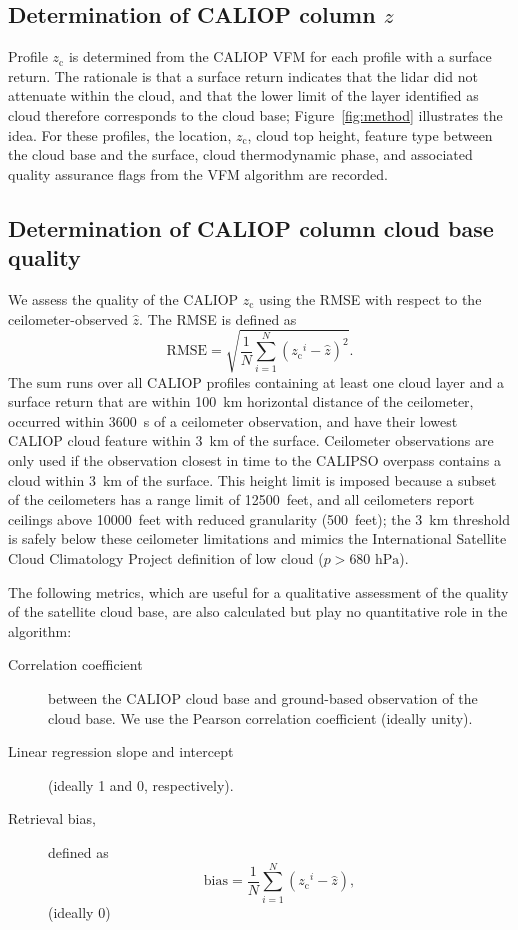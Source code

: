 \documentclass[essd,manuscript]{copernicus}
\begin{document}
\subsection{Determination of CALIOP column \ensuremath{z}{}}
\label{sec:algorithm:local}
Profile \ensuremath{z_\text{c}}{} is determined from the CALIOP VFM for each profile with a surface
return.  The rationale is that a surface return indicates that the lidar did not
attenuate within the cloud, and that the lower limit of the layer identified as
cloud therefore corresponds to the cloud base; Figure~\ref{fig:method}
illustrates the idea.  For these profiles, the location, \ensuremath{z_\text{c}}{}, cloud top height,
feature type between the cloud base and the surface,
cloud thermodynamic phase, and associated quality assurance flags from the VFM
algorithm are recorded.

\subsection{Determination of CALIOP column cloud base quality}
\label{sec:algorithm:qual}
We assess the quality of the CALIOP \ensuremath{z_\text{c}}{} using the RMSE with respect to the
ceilometer-observed $\hat{z}$.  The RMSE is defined as
\begin{equation}
  \label{eq:rmse}
  \text{RMSE} = \sqrt{\frac{1}{N}\sum\limits_{i = 1}^{N}\left(\ensuremath{z_\text{c}}^i - \hat{z}\right)^2}.
\end{equation}
The sum runs over all CALIOP profiles containing at least one cloud layer and a
surface return that are within 100~km horizontal distance of the ceilometer,
occurred within 3600~s of a ceilometer observation, and have their lowest CALIOP
cloud feature within 3~km of the surface.  Ceilometer observations are only used
if the observation closest in time to the CALIPSO overpass contains a cloud
within 3~km of the surface.  This height limit is imposed because a subset of
the ceilometers has a range limit of 12500~feet, and all ceilometers report
ceilings above 10000~feet with reduced granularity (500~feet); the 3~km
threshold is safely below these ceilometer limitations and mimics the
International Satellite Cloud Climatology Project \citep[ISCCP,][]{Rossow1999}
definition of low cloud ($p > 680\text{ hPa}$).

The following metrics, which are useful for a qualitative assessment of the
quality of the satellite cloud base, are also calculated but play no
quantitative role in the algorithm:
\begin{description}
\item[Correlation coefficient] between the CALIOP cloud base and ground-based
  observation of the cloud base.  We use the Pearson correlation coefficient
  (ideally unity).  
\item[Linear regression slope and intercept] (ideally 1 and 0, respectively).  
\item[Retrieval bias,] defined as
  \begin{equation}
    \label{eq:bias}
    \mbox{bias} = \frac{1}{N}\sum\limits_{i = 1}^{N}\left(\ensuremath{z_\text{c}}^i - \hat{z}\right),
  \end{equation}(ideally 0)
\end{description}
\end{document}
